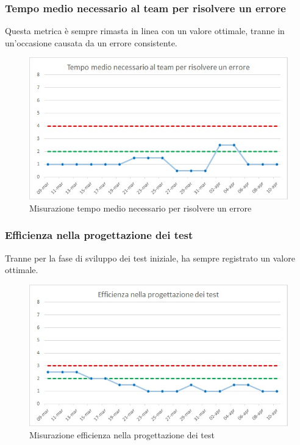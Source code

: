 \subsubsection{Tempo medio necessario al team per risolvere un errore}
Questa metrica è sempre rimasta in linea con un valore ottimale, tranne in un'occasione causata da un errore consistente.
\begin{figure} [H]
	\centering
	\includegraphics[scale=1]{Img/risErr}
	\caption{Misurazione tempo medio necessario per risolvere un errore}\label{}
\end{figure}

\subsubsection{Efficienza nella progettazione dei test}
Tranne per la fase di sviluppo dei test iniziale, ha sempre registrato un valore ottimale.
\begin{figure} [H]
	\centering
	\includegraphics[scale=1]{Img/progTest}
	\caption{Misurazione efficienza nella progettazione dei test}\label{}
\end{figure}


